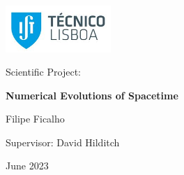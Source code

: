 \documentclass[11pt,twocolumn]{article}
\begin{document}
\begin{titlepage}
    \begin{flushleft}
        \vspace*{-1.5cm}
        \hspace*{-0.1cm}
        \includegraphics[width=4cm]{Images/college_logo.jpg}
    \end{flushleft}
    
    \vspace{5cm}
    
    \centering
    {\Large Scientific Project:\par}
    {\Huge\bfseries Numerical Evolutions of Spacetime\par}
    
    \vspace{10cm}
    
    {\large Filipe Ficalho\par}
    \vspace{0.5cm}
    {\large Supervisor: David Hilditch\par}
    
    \vfill
    
    {\large June 2023\par}
\end{titlepage}

\twocolumn[
\begin{@twocolumnfalse}
    \hrulefill %
    \begin{abstract}
        
    \end{abstract}
    \hrulefill %
\end{@twocolumnfalse}
\vspace{0.5cm}
]

















\newpage

\appendix


\end{document}
